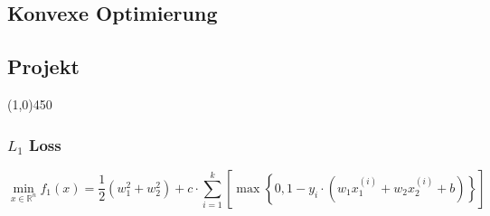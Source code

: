 \documentclass[12pt,landscape]{article}
\newcommand{\hr}{\begin{center} \line(1,0){450} \end{center}}
\newcommand{\tr}{^\mathsf{T}}
\begin{document}
\begin{center}
	\section*{Konvexe Optimierung}
	\subsection*{Projekt}
\end{center}
\hr
%
%
%
\subsubsection*{$L_1$ Loss}
\begin{equation}
\min\limits_{x \in \mathbb{R}^n} f_1(x) = \frac{1}{2} \left(  w_1^2 + w_2^2 \right) +c \cdot \sum\limits_{i=1}^k \left[ \max \left\{ 0,1-y_i \cdot \left( w_1  x_1^{(i)} +  w_2  x_2^{(i)} + b \right) \right\}\right]
\end{equation}
\end{document}
